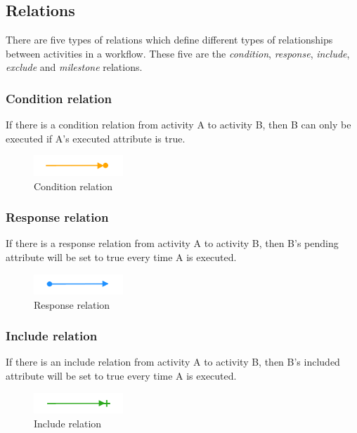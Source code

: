\documentclass{article}
\begin{document}
	\subsection{Relations}
	There are five types of relations which define different types of relationships between activities in a workflow. 
	These five are the \emph{condition}, \emph{response}, \emph{include}, \emph{exclude} and \emph{milestone} relations.

	\subsubsection{Condition relation}
	If there is a condition relation from activity A to activity B, then B can only be executed if A's executed attribute is true.
	\begin{figure}[h!]
		\centering
		\includegraphics[width=0.3\textwidth]{figures/ConditionRelation.png}
	 	\caption[Condition relation]
	 	{Condition relation}
	\end{figure}

	\subsubsection{Response relation}
	If there is a response relation from activity A to activity B, then B's pending attribute will be set to true every time A is executed.
	\begin{figure}[h!]
		\centering
		\includegraphics[width=0.3\textwidth]{figures/ResponseRelation.png}
	 	\caption[Response relation]
	 	{Response relation}
	\end{figure}

	\subsubsection{Include relation}
	If there is an include relation from activity A to activity B, then B's included attribute will be set to true every time A is executed.
	\begin{figure}[h!]
		\centering
		\includegraphics[width=0.3\textwidth]{figures/IncludeRelation.png}
	 	\caption[Include relation]
	 	{Include relation}
	\end{figure}
\end{document}
